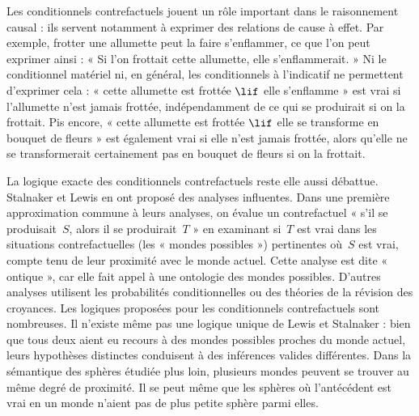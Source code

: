 \documentclass[../../../include/open-logic-section]{subfiles}
\begin{document}
Les conditionnels contrefactuels jouent un rôle important dans le
raisonnement causal : ils servent notamment à exprimer des relations
de cause à effet. Par exemple, frotter une allumette peut la faire
s'enflammer, ce que l'on peut exprimer ainsi : « Si l'on frottait
cette allumette, elle s'enflammerait. » Ni le conditionnel matériel
ni, en général, les conditionnels à l'indicatif ne permettent
d'exprimer cela : « cette allumette est frottée $\lif$ elle s'enflamme » est vrai
si l'allumette n'est jamais frottée, indépendamment de ce qui se
produirait si on la frottait. Pis encore, « cette allumette est frottée
$\lif$ elle se transforme en bouquet de fleurs » est également vrai si
elle n'est jamais frottée, alors qu'elle ne se transformerait certainement pas en
bouquet de fleurs si on la frottait.

La logique exacte des conditionnels contrefactuels reste elle aussi
débattue. Stalnaker et Lewis en ont proposé des analyses influentes.
Dans une première approximation commune à leurs analyses, on évalue
un contrefactuel « s'il se produisait~$S$, alors il se
produirait~$T$ » en examinant si~$T$ est vrai dans les situations
contrefactuelles (les « mondes possibles ») pertinentes où~$S$ est
vrai, compte tenu de leur proximité avec le monde actuel. Cette
analyse est dite « ontique », car elle fait appel à une ontologie des
mondes possibles. D'autres
analyses utilisent les probabilités conditionnelles ou des théories
de la révision des croyances. Les logiques proposées pour les
conditionnels contrefactuels sont nombreuses. Il n'existe même pas
une logique unique de Lewis et Stalnaker : bien que tous deux aient
eu recours à des mondes possibles proches du monde actuel, leurs
hypothèses distinctes conduisent à des inférences valides
différentes. Dans la sémantique des sphères étudiée plus loin,
plusieurs mondes peuvent se trouver au même degré de proximité.
Il se peut même que les sphères où l'antécédent est vrai en un
monde n'aient pas de plus petite sphère parmi elles.
\end{document}
